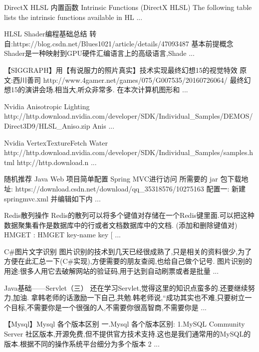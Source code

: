 DirectX HLSL 内置函数
Intrinsic Functions (DirectX HLSL) The following table lists the intrinsic functions available in HL ...

HLSL Shader编程基础总结
转自:https://blog.csdn.net/Blues1021/article/details/47093487 基本前提概念 Shader是一种映射到GPU硬件汇编语言上的高级语言,Shade ...

【SIGGRAPH】用【有说服力的照片真实】技术实现最终幻想15的视觉特效
原文:西川善司 http://www.4gamer.net/games/075/G007535/20160726064/   最终幻想15的演讲会场.相当大,听众非常多.      在本次计算机图形和 ...

Nvidia Anisotropic Lighting
http://http.download.nvidia.com/developer/SDK/Individual_Samples/DEMOS/Direct3D9/HLSL_Aniso.zip Anis ...

Nvidia VertexTextureFetch Water
http://http.download.nvidia.com/developer/SDK/Individual_Samples/samples.html http://http.download.n ...

随机推荐
Java Web 项目简单配置 Spring MVC进行访问
所需要的 jar 包下载地址: https://download.csdn.net/download/qq_35318576/10275163 配置一: 新建 springmvc.xml 并编辑如下内 ...

Redis散列操作
Redis的散列可以将多个键值对存储在一个Redis键里面.可以把这种数据聚集看作是数据库中的行或者文档数据库中的文档. (添加和删除键值对) HMGET : HMGET key-name key [ ...

C#图片文字识别
图片识别的技术到几天已经很成熟了,只是相关的资料很少,为了方便在此汇总一下(C#实现),方便需要的朋友查阅,也给自己做个记号. 图片识别的用途:很多人用它去破解网站的验证码,用于达到自动刷票或者是批量 ...

Java基础——Servlet（三）
还在学习Servlet,觉得这里的知识点蛮多的.还要继续努力,加油. 拿韩老师的话激励一下自己,共勉.韩老师说,“成功其实也不难,只要树立一个目标,不需要你是一个很强的人,不需要你很高智商,不需要你是 ...

【Mysql】Mysql 各个版本区别
一.Mysql 各个版本区别: 1.MySQL Community Server 社区版本,开源免费,但不提供官方技术支持.这也是我们通常用的MySQL的版本.根据不同的操作系统平台细分为多个版本 2 ...


